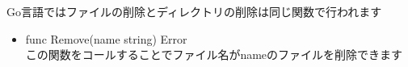 Go言語ではファイルの削除とディレクトリの削除は同じ関数で行われます

\begin{itemize}
  \item func Remove(name string) Error\\ この関数をコールすることでファイル名がnameのファイルを削除できます
\end{itemize}
